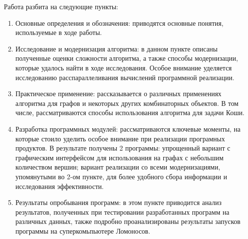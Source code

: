Работа разбита на следующие пункты:
\begin{enumerate}
\item Основные определения и обозначения: приводятся основные понятия, используемые в ходе работы.
\item Исследование и модернизация алгоритма: в данном пункте описаны полученные оценки сложности алгоритма, а также способы модернизации, которые удалось найти в ходе исследования. Особое внимание уделяется исследованию расспараллеливания вычислений программной реализации.
\item Практическое применение: рассказывается о различных применениях алгоритма для графов и некоторых других комбинаторных объектов. В том числе, рассматриваются способы использования алгоритма для задачи Коши.
\item Разработка программных модулей: рассматриваются ключевые моменты, на которые стоило уделить особое внимание при реализации програмных продуктов. В результате получены 2 программы: упрощенный вариант с графическим интерфейсом для использования на графах с небольшим количеством вершин; вариант реализации со всеми модернизациями, упомянутыми во 2-ом пункте, для более удобного сбора информации и исследования эффективности.
\item Результаты опробывания программ: в этом пункте приводится анализ результатов, полученных при тестировании разработанных программ на различных данных, также подробно проанализированы результаты запусков программы на суперкомьпьютере Ломоносов.
\end{enumerate}